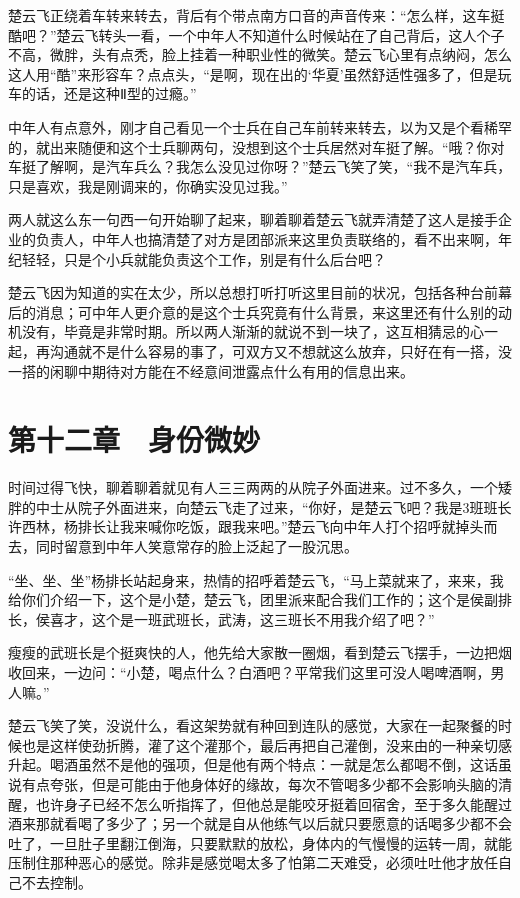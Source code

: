楚云飞正绕着车转来转去，背后有个带点南方口音的声音传来：“怎么样，这车挺酷吧？”楚云飞转头一看，一个中年人不知道什么时候站在了自己背后，这人个子不高，微胖，头有点秃，脸上挂着一种职业性的微笑。楚云飞心里有点纳闷，怎么这人用“酷”来形容车？点点头，“是啊，现在出的‘华夏’虽然舒适性强多了，但是玩车的话，还是这种Ⅱ型的过瘾。”

中年人有点意外，刚才自己看见一个士兵在自己车前转来转去，以为又是个看稀罕的，就出来随便和这个士兵聊两句，没想到这个士兵居然对车挺了解。“哦？你对车挺了解啊，是汽车兵么？我怎么没见过你呀？”楚云飞笑了笑，“我不是汽车兵，只是喜欢，我是刚调来的，你确实没见过我。”

两人就这么东一句西一句开始聊了起来，聊着聊着楚云飞就弄清楚了这人是接手企业的负责人，中年人也搞清楚了对方是团部派来这里负责联络的，看不出来啊，年纪轻轻，只是个小兵就能负责这个工作，别是有什么后台吧？

楚云飞因为知道的实在太少，所以总想打听打听这里目前的状况，包括各种台前幕后的消息；可中年人更介意的是这个士兵究竟有什么背景，来这里还有什么别的动机没有，毕竟是非常时期。所以两人渐渐的就说不到一块了，这互相猜忌的心一起，再沟通就不是什么容易的事了，可双方又不想就这么放弃，只好在有一搭，没一搭的闲聊中期待对方能在不经意间泄露点什么有用的信息出来。

\section{第十二章　身份微妙}

时间过得飞快，聊着聊着就见有人三三两两的从院子外面进来。过不多久，一个矮胖的中士从院子外面进来，向楚云飞走了过来，“你好，是楚云飞吧？我是3班班长许西林，杨排长让我来喊你吃饭，跟我来吧。”楚云飞向中年人打个招呼就掉头而去，同时留意到中年人笑意常存的脸上泛起了一股沉思。

“坐、坐、坐”杨排长站起身来，热情的招呼着楚云飞，“马上菜就来了，来来，我给你们介绍一下，这个是小楚，楚云飞，团里派来配合我们工作的；这个是侯副排长，侯喜才，这个是一班武班长，武涛，这三班长不用我介绍了吧？”

瘦瘦的武班长是个挺爽快的人，他先给大家散一圈烟，看到楚云飞摆手，一边把烟收回来，一边问：“小楚，喝点什么？白酒吧？平常我们这里可没人喝啤酒啊，男人嘛。”

楚云飞笑了笑，没说什么，看这架势就有种回到连队的感觉，大家在一起聚餐的时候也是这样使劲折腾，灌了这个灌那个，最后再把自己灌倒，没来由的一种亲切感升起。喝酒虽然不是他的强项，但是他有两个特点：一就是怎么都喝不倒，这话虽说有点夸张，但是可能由于他身体好的缘故，每次不管喝多少都不会影响头脑的清醒，也许身子已经不怎么听指挥了，但他总是能咬牙挺着回宿舍，至于多久能醒过酒来那就看喝了多少了；另一个就是自从他练气以后就只要愿意的话喝多少都不会吐了，一旦肚子里翻江倒海，只要默默的放松，身体内的气慢慢的运转一周，就能压制住那种恶心的感觉。除非是感觉喝太多了怕第二天难受，必须吐吐他才放任自己不去控制。

